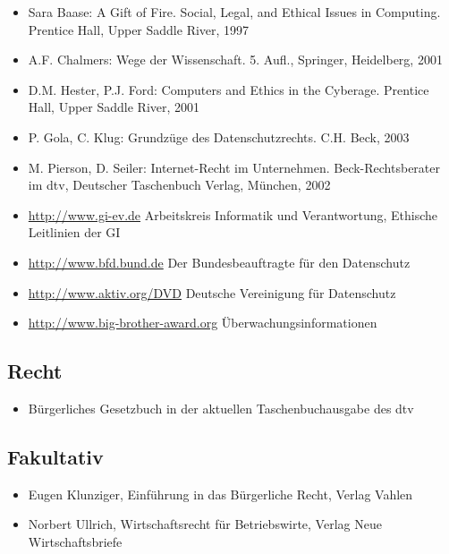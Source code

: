 \begin{itemize}
\tightlist
\item
  Sara Baase: A Gift of Fire. Social, Legal, and Ethical Issues in
  Computing. Prentice Hall, Upper Saddle River, 1997
\item
  A.F. Chalmers: Wege der Wissenschaft. 5. Aufl., Springer, Heidelberg,
  2001
\item
  D.M. Hester, P.J. Ford: Computers and Ethics in the Cyberage. Prentice
  Hall, Upper Saddle River, 2001
\item
  P. Gola, C. Klug: Grundzüge des Datenschutzrechts. C.H. Beck, 2003
\item
  M. Pierson, D. Seiler: Internet-Recht im Unternehmen.
  Beck-Rechtsberater im dtv, Deutscher Taschenbuch Verlag, München, 2002
\item
  \url{http://www.gi-ev.de} Arbeitskreis Informatik und Verantwortung,
  Ethische Leitlinien der GI
\item
  \url{http://www.bfd.bund.de} Der Bundesbeauftragte für den Datenschutz
\item
  \url{http://www.aktiv.org/DVD} Deutsche Vereinigung für Datenschutz
\item
  \url{http://www.big-brother-award.org} Überwachungsinformationen
\end{itemize}

\hypertarget{rechtpathlabelmi-2017modulbeschreibungen-bachelorba_mug-1}{%
\subsection*{Recht\label{/mi-2017/modulbeschreibungen-bachelor/BA_MUG}}\label{rechtpathlabelmi-2017modulbeschreibungen-bachelorba_mug-1}}

\begin{itemize}
\tightlist
\item
  Bürgerliches Gesetzbuch in der aktuellen Taschenbuchausgabe des dtv
\end{itemize}

\hypertarget{fakultativpathlabelmi-2017modulbeschreibungen-bachelorba_mug}{%
\subsection*{Fakultativ\label{/mi-2017/modulbeschreibungen-bachelor/BA_MUG}}\label{fakultativpathlabelmi-2017modulbeschreibungen-bachelorba_mug}}

\begin{itemize}
\tightlist
\item
  Eugen Klunziger, Einführung in das Bürgerliche Recht, Verlag Vahlen
\item
  Norbert Ullrich, Wirtschaftsrecht für Betriebswirte, Verlag Neue
  Wirtschaftsbriefe
\end{itemize}

